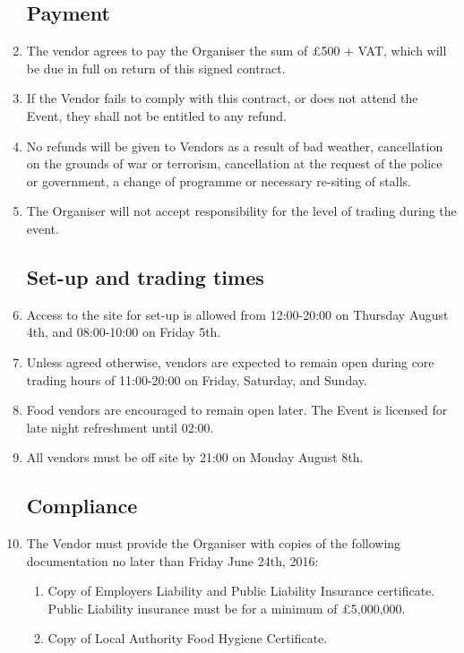 \begin{enumerate}

\subsection*{Payment}
\item The vendor agrees to pay the Organiser the sum of £500 + VAT, which will be due in
      full on return of this signed contract.
\item If the Vendor fails to comply with this contract, or does not attend the Event,
        they shall not be entitled to any refund.
\item No refunds will be given to Vendors as a result of bad weather, cancellation on the
        grounds of war or terrorism, cancellation at the request of the police or government,
        a change of programme or necessary re-siting of stalls.
\item The Organiser will not accept responsibility for the level of trading during the event.

\subsection*{Set-up and trading times}
\item Access to the site for set-up is allowed from 12:00-20:00 on Thursday August 4th, and
        08:00-10:00 on Friday 5th.
\item Unless agreed otherwise, vendors are expected to remain open during core trading
        hours of 11:00-20:00 on Friday, Saturday, and Sunday.
\item Food vendors are encouraged to remain open later. The Event is licensed for late
        night refreshment until 02:00.
\item All vendors must be off site by 21:00 on Monday August 8th.

\subsection*{Compliance}
\item The Vendor must provide the Organiser with copies of the following documentation no later
        than Friday June 24th, 2016:
\begin{enumerate}
    \item Copy of Employers Liability and Public Liability Insurance certificate.
            Public Liability insurance must be for a minimum of £5,000,000.
    \item Copy of Local Authority Food Hygiene Certificate.
\end{enumerate}


\end{enumerate}
